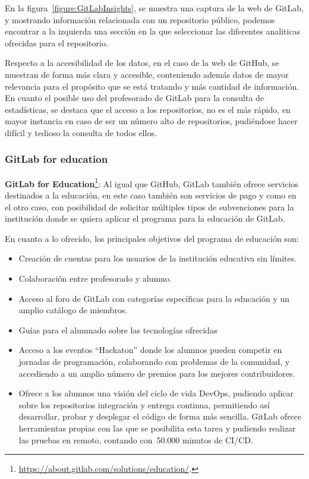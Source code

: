 En la figura~\ref{figure:GitLabInsights}, se muestra una captura de la web
de GitLab, y mostrando información relacionada con un repositorio público,
podemos encontrar a la izquierda una sección en la que seleccionar las
diferentes analiticas ofrecidas para el repositorio.

Respecto a la accesibilidad de los datos, en el caso de la web de GitHub,
se muestran de forma más clara y accesible, conteniendo además datos de
mayor relevancia para el propósito que se está tratando y más cantidad de
información. En cuanto el posible uso del profesorado de GitLab para la
consulta de estadísticas, se destaca que el acceso a los repositorios, no
es el más rápido, en mayor instancia en caso de ser un número alto de
repositorios, pudiéndose hacer difícil y tedioso la consulta de todos
ellos.

\subsubsection{GitLab for education}

\textbf{GitLab for
  Education}\footnote{\url{https://about.gitlab.com/solutions/education/}.}:
Al igual que GitHub, GitLab también ofrece servicios destinados a la
educación, en este caso también son servicios de pago y como en el otro
caso, con posibilidad de solicitar múltiples tipos de subvenciones para la
institución donde se quiera aplicar el programa para la educación de
GitLab.

En cuanto a lo ofrecido, los principales objetivos del programa de
educación son:

\begin{itemize}
\item Creación de cuentas para los usuarios de la institución educativa sin
  límites.
\item Colaboración entre profesorado y alumno.
\item Acceso al foro de GitLab con categorías específicas para la educación
  y un amplio catálogo de miembros.
\item Guías para el alumnado sobre las tecnologías ofrecidas
\item Acceso a los eventos ``Hackaton'' donde los alumnos pueden competir
  en jornadas de programación, colaborando con problemas de la comunidad, y
  accediendo a un amplio número de premios para los mejores contribuidores.
\item Ofrece a los alumnos una visión del ciclo de vida DevOps, pudiendo
  aplicar sobre los repositorios integración y entrega continua,
  permitiendo así desarrollar, probar y desplegar el código de forma más
  sencilla. GitLab ofrece herramientas propias con las que se posibilita
  esta tarea y pudiendo realizar las pruebas en remoto, contando con~50.000
  minutos de CI/CD.
\end{itemize}


